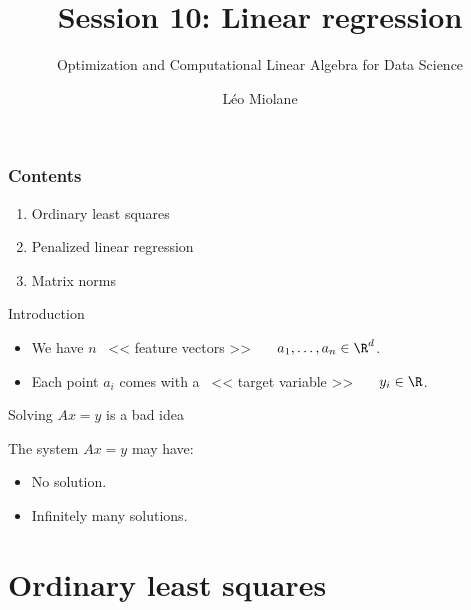 \documentclass{beamer}
\title{Session 10: Linear regression}
\subtitle{Optimization and Computational Linear Algebra for Data Science}
\author{Léo Miolane}
\date{}
\begin{document}
\setcounter{showProgressBar}{0}
\setcounter{showSlideNumbers}{0}

\frame{\titlepage}
\setcounter{framenumber}{0}
\setcounter{showSlideNumbers}{1}

\begin{frame}
	\frametitle{Contents}
	\begin{enumerate}
		\item Ordinary least squares
		\item Penalized linear regression
		\item Matrix norms
	\end{enumerate}
\end{frame}

\begin{frame}[t]{Introduction}
	\grid

	\begin{itemize}
		\item We have $n$  \ << feature vectors >> \ \ \ $a_1, \dots, a_n \in \R^d$.
		\item Each point $a_i$ comes with a \ << target variable >> \ \ \ $y_i \in \R$.
	\end{itemize}

\end{frame}


\begin{frame}[t]{Solving $Ax=y$ is a bad idea}
	\grid

	The system $Ax = y$ may have:
	\begin{itemize}
		\item No solution.
			\vspace{3cm}
		\item Infinitely many solutions.
	\end{itemize}

\end{frame}

\section{Ordinary least squares}
\end{document}
